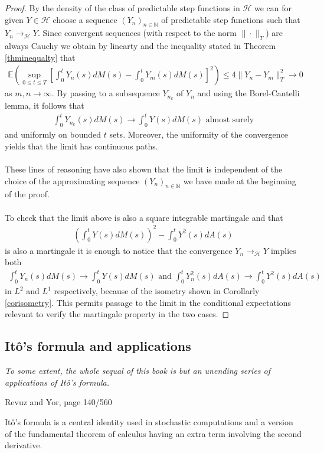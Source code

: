 \documentclass[11pt,a4paper, final]{article}
\begin{document}
\begin{proof}
By the density of the class of predictable step functions in $\mathcal{H}$ we can  for given $Y \in \mathcal{H}$ choose a sequence $(Y_n)_{n \in \mathbb{N}}$ of predictable step functions such that $Y_n \to_\mathcal{H} Y$. Since convergent sequences (with respect to the norm $\| \cdot \|_T$) are always Cauchy we obtain by linearty and the inequality stated in Theorem \ref{thminequalty} that
\begin{align*}
\mathbb{E} \left( \sup_{0 \leq t \leq T} \left[ \int_0^t Y_n(s) dM(s) - \int_0^t Y_m(s) dM(s) \right]^2 \right) \leq 4 \| Y_n -Y_m \|_T^2 \to 0 
\end{align*}
as $m,n \to \infty$. By passing to a subsequence $Y_{n_k}$ of $Y_n$ and using the Borel-Cantelli lemma, it follows that \begin{align*}
\int_0^t Y_{n_k} (s) dM(s) \to \int_0^t Y(s) dM(s) \text{ almost surely}
\end{align*}
and uniformly on bounded $t$ sets. Moreover, the uniformity of the convergence yields that the limit has continuous paths. 
\\\\
These lines of reasoning have also shown that the limit is independent of the choice of the approximating sequence $(Y_n)_{n \in \mathbb{N}}$ we have made at the beginning of the proof. 
\\\\
To check that the limit above is also a square integrable martingale and that 
\begin{align*}
\left( \int_0^t Y(s) dM(s) \right)^2 - \int_0^t Y^2(s) dA(s)
\end{align*}
is also a martingale it is enough to notice that the convergence $Y_n \to_\mathcal{H} Y$ implies both
\begin{align*}
\int_0^t Y_n(s) dM(s) \to \int_0^t Y(s) dM(s) \text{ and } \int_0^t Y_n^2(s)dA(s) \to \int_0^t Y^2(s) dA(s)
\end{align*}
in $L^2$ and $L^1$ respectively, because of the isometry shown in Corollarly \ref{corisometry}. This permits passage to the limit in the conditional expectations relevant to verify the martingale property in the two cases. 
\end{proof}
\newpage
\subsection{Itô's formula and applications}
\epigraph{\textit{To some extent, the whole sequal of this book is but an unending series of applications of Itô's formula.}}{Revuz and Yor, page 140/560}
\noindent Itô's formula is a central identity used in stochastic computations and a version of the fundamental theorem of calculus having an extra term involving the second derivative. 
\end{document}
